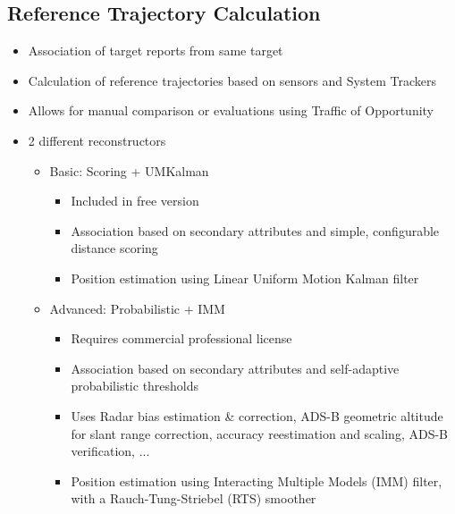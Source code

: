 \subsection{Reference Trajectory Calculation}    
\begin{itemize}  
    \item Association of target reports from same target
    \item Calculation of reference trajectories based on sensors and System Trackers
    \item Allows for manual comparison or evaluations using Traffic of Opportunity
    \item 2 different reconstructors
    \begin{itemize}  
        \item Basic: Scoring + UMKalman
        \begin{itemize}  
            \item Included in free version
            \item Association based on secondary attributes and simple, configurable distance scoring
            \item Position estimation using Linear Uniform Motion Kalman filter
        \end{itemize}  
        \item Advanced: Probabilistic + IMM
        \begin{itemize}  
            \item Requires commercial professional license
            \item Association based on secondary attributes and self-adaptive probabilistic thresholds
            \item Uses Radar bias estimation \& correction, ADS-B geometric altitude for slant range correction, accuracy reestimation and scaling, ADS-B verification, ...
            \item Position estimation using Interacting Multiple Models (IMM) filter, with a Rauch-Tung-Striebel (RTS) smoother
        \end{itemize}          
    \end{itemize}  
\end{itemize}

